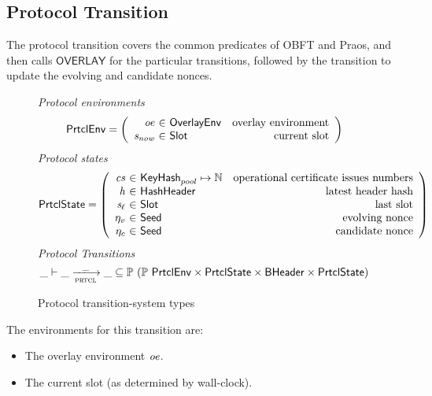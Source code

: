 \clearpage

\subsection{Protocol Transition}
\label{sec:protocol-trans}

The protocol transition covers the common predicates of OBFT and Praos,
and then calls $\mathsf{OVERLAY}$ for the particular transitions,
followed by the transition to update the evolving and candidate nonces.

\begin{figure}
  \emph{Protocol environments}
  \begin{equation*}
    \PrtclEnv =
    \left(
      \begin{array}{r@{~\in~}lr}
        \var{oe} & \OverlayEnv & \text{overlay environment} \\
        \var{s_{now}} & \Slot & \text{current slot} \\
      \end{array}
    \right)
  \end{equation*}
  \emph{Protocol states}
  \begin{equation*}
    \PrtclState =
    \left(
      \begin{array}{r@{~\in~}lr}
        \var{cs} & \KeyHash_{pool} \mapsto \N & \text{operational certificate issues numbers} \\
        \var{h} & \HashHeader & \text{latest header hash} \\
        \var{s_\ell} & \Slot & \text{last slot} \\
        \eta_v & \Seed & \text{evolving nonce} \\
        \eta_c & \Seed & \text{candidate nonce} \\
      \end{array}
    \right)
  \end{equation*}
  \emph{Protocol Transitions}
  \begin{equation*}
    \_ \vdash \var{\_} \trans{prtcl}{\_} \var{\_} \subseteq
    \powerset (\powerset{\PrtclEnv} \times \PrtclState \times \BHeader \times \PrtclState)
  \end{equation*}
  \caption{Protocol transition-system types}
  \label{fig:ts-types:prtcl}
\end{figure}

The environments for this transition are:
\begin{itemize}
  \item The overlay environment $\mathit{oe}$.
  \item The current slot (as determined by wall-clock).
\end{itemize}

